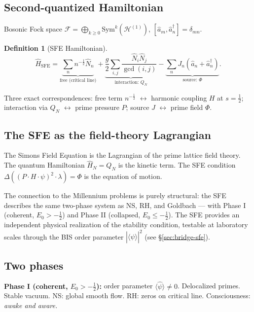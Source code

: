 \documentclass[12pt]{article}
\newtheorem{definition}[theorem]{Definition}
\newcommand{\Hil}{\mathcal{H}}
\newcommand{\half}{\tfrac{1}{2}}
\newcommand{\Fock}{\mathcal{F}}
\begin{document}
\subsection{Second-quantized Hamiltonian}

Bosonic Fock space
$\Fock = \bigoplus_{k\ge0}\mathrm{Sym}^k(\Hil^{(1)})$,
$[\hat{a}_m,\hat{a}_n^\dagger] = \delta_{mn}$.

\begin{tcolorbox}[sfebox]
\begin{definition}[SFE Hamiltonian]
\[
  \hat{H}_{\mathrm{SFE}}
  = \underbrace{\sum_n n^{-\half}\hat{N}_n}_{\text{free (critical line)}}
  + \underbrace{\frac{g}{2}\sum_{i,j}
    \frac{\hat{N}_i\hat{N}_j}{\gcd(i,j)}}_{\text{interaction: }Q_N}
  - \underbrace{\sum_n J_n(\hat{a}_n+\hat{a}_n^\dagger)}_{\text{source: }\Phi}.
\]
\end{definition}
\end{tcolorbox}

Three exact correspondences:
free term $n^{-\half}$ $\leftrightarrow$ harmonic coupling $H$ at $s=\half$;
interaction via $Q_N$ $\leftrightarrow$ prime pressure $P$;
source $J$ $\leftrightarrow$ prime field $\Phi$.

\subsection{The SFE as the field-theory Lagrangian}
\label{sec:sfe-lagrangian}

The Simons Field Equation is the Lagrangian of the prime lattice field theory.
The quantum Hamiltonian $\hat{H}_N = Q_N$ is the kinetic term.
The SFE condition $\Delta((P\cdot H\cdot\psi)^2\cdot\lambda)=\Phi$
is the equation of motion.

The connection to the Millennium problems is purely structural:
the SFE describes the same two-phase system as NS, RH, and Goldbach ---
with Phase I (coherent, $E_0 > -\half$) and Phase II (collapsed, $E_0 \le -\half$).
The SFE provides an independent physical realization of the stability condition,
testable at laboratory scales through the BIS order parameter
$|\langle\hat{\psi}\rangle|^2$ (see \S\ref{sec:bridge-sfe}).

\subsection{Two phases}

\textbf{Phase I (coherent, $E_0>-\half$):}
order parameter $\langle\hat{\psi}\rangle \ne 0$.
Delocalized primes.  Stable vacuum.
NS: global smooth flow.  RH: zeros on critical line.
Consciousness: \emph{awake and aware.}
\end{document}
